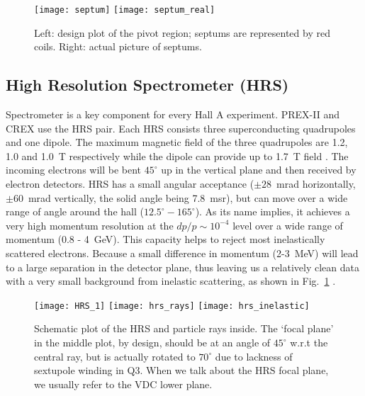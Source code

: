\begin{figure}[!h]
    \texttt{[image: septum]}
    \texttt{[image: septum\_real]}
    \caption{Left: design plot of the pivot region; septums are represented by
    red coils. Right: actual picture of septums.
    }
\end{figure}

\subsection{High Resolution Spectrometer (HRS)}
Spectrometer is a key component for every Hall A experiment. PREX-II and CREX
use the HRS pair. Each HRS consists three superconducting
quadrupoles and one dipole. The maximum magnetic field of the three quadrupoles are
1.2, 1.0 and 1.0~T respectively while the dipole can provide up to 1.7~T field \cite{halla_parity}. 
The incoming electrons will be bent $45^\circ$ up in the vertical plane and then
received by electron detectors.
HRS has a small angular acceptance ($\pm 28$~mrad horizontally, $\pm 60$~mrad vertically, 
the solid angle being 7.8~msr), but can move over a wide range of angle
around the hall ($12.5^\circ - 165^\circ$). As its name implies, it achieves a 
very high momentum resolution at the $dp/p \sim 10^{-4}$ level over a wide range of momentum 
(0.8 - 4~GeV). This capacity helps to reject most inelastically scattered electrons.
Because a small difference in momentum (2-3~MeV) will lead to a
large separation in the detector plane, thus leaving us a relatively clean data 
with a very small background from inelastic scattering, as shown in Fig.~\ref{fig:HRS} .

\begin{figure}[!h]
    \centering
    \texttt{[image: HRS\_1]}
    \texttt{[image: hrs\_rays]}
    \texttt{[image: hrs\_inelastic]}
    \caption{Schematic plot of the HRS and particle rays inside. \cite{halla3d}
    The `focal plane' in the middle plot, by design, should be at an angle of $45^\circ$
    w.r.t the central ray, but is actually rotated to $70^\circ$ due to lackness
    of sextupole winding in Q3. When we talk about the HRS focal plane, we
    usually refer to the VDC lower plane.
    }
    \label{fig:HRS}
\end{figure}


